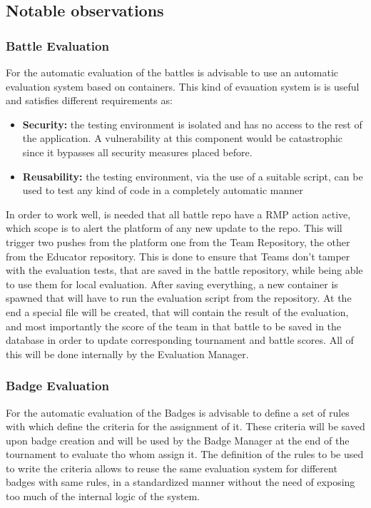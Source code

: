 \subsection{Notable observations}
\subsubsection{Battle Evaluation} \label{parr:battleEvaluation}
For the automatic evaluation of the battles is advisable to use an automatic evaluation system based on containers.
This kind of evauation system is is useful and satisfies different requirements as:
\begin{itemize}
    \item \textbf{Security:} the testing environment is isolated and has no access to the rest of the application. A vulnerability at this component would be catastrophic since it bypasses all security measures placed before.
    \item \textbf{Reusability:} the testing environment, via the use of a suitable script, can be used to test any kind of code in a completely automatic manner
\end{itemize}
In order to work well, is needed that all battle repo have a RMP action active, which scope is to alert the platform of any new update to the repo. This will trigger two pushes from the platform one from the Team Repository, the other from the Educator repository. 
This is done to ensure that Teams don't tamper with the evaluation tests, that are saved in the battle repository, while being able to use them for local evaluation. 
After saving everything, a new container is spawned that will have to run the evaluation script from the repository. 
At the end a special file will be created, that will contain the result of the evaluation, and most importantly the score of the team in that battle to be saved in the database in order to update corresponding tournament and battle scores.
All of this will be done internally by the Evaluation Manager.
\subsubsection{Badge Evaluation} \label{parr:badgeEvaluation}
For the automatic evaluation of the Badges is advisable to define a set of rules with which define the criteria for the assignment of it.
These criteria will be saved upon badge creation and will be used by the Badge Manager at the end of the tournament to evaluate tho whom assign it.
The definition of the rules to be used to write the criteria allows to reuse the same evaluation system for different badges with same rules, in a standardized manner without the need of exposing too much of the internal logic of the system.


